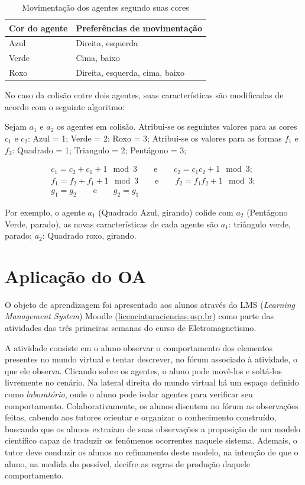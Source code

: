 \documentclass{article}
\begin{document}
\footnotesize

\begin{table}
\begin{center}
	\begin{tabular}{ll}		
		Cor do agente & Preferências de movimentação \\
		\hline \hline
		Azul          & Direita, esquerda \\
		Verde         & Cima, baixo \\
		Roxo          & Direita, esquerda, cima, baixo
	\end{tabular}
	\caption{Movimentação dos agentes segundo suas cores}
	\label{tab:cor-vs-movimentacao}
\end{center}
\end{table}

\normalsize
No caso da colisão entre dois agentes, suas características são modificadas de
acordo com o seguinte algoritmo:

Sejam $a_1$ e $a_2$ os agentes em colisão. Atribui-se os seguintes valores para as cores $c_1$ e $c_2$: Azul = 1; Verde = 2; Roxo = 3;
Atribui-se os valores para as formas $f_1$ e $f_2$: Quadrado = 1; Triangulo = 2; Pentágono = 3;

\begin{gather}
c_1 = c_2 + c_1 + 1 \mod 3 \qquad\text{e}\qquad c_2 = c_1 c_2 + 1 \mod 3;\\
f_1 = f_2 + f_1 + 1 \mod 3 \qquad\text{e}\qquad f_2 = f_1 f_2 + 1 \mod 3;\\
g_1 = g_2 \qquad\text{e}\qquad g_2 = g_1
\end{gather}

Por exemplo, o agente $a_1$ (Quadrado Azul, girando) colide com $a_2$ (Pentágono Verde, parado),
as novas características de cada agente são $a_1$: triângulo verde, parado;
$a_2$: Quadrado roxo, girando. %

\section{Aplicação do OA}

O objeto de aprendizagem foi apresentado aos alunos através do LMS (\emph{Learning
Management System}) Moodle (\url{licenciaturaciencias.usp.br}) como parte das atividades das três primeiras semanas do curso de Eletromagnetismo. 

A atividade consiste em o aluno observar o comportamento dos elementos presentes no mundo virtual e tentar descrever, no fórum associado à atividade, 
o que ele observa. Clicando sobre os agentes, o aluno pode movê-los e soltá-los livremente no cenário. Na lateral direita do mundo virtual há um espaço 
definido como \emph{laboratório}, onde o aluno pode isolar agentes para verificar seu comportamento. Colaborativamente, os alunos discutem no fórum
as observações feitas, cabendo aos tutores orientar e organizar o conhecimento construído, buscando que os alunos extraiam de suas observações 
a proposição de um modelo científico capaz de traduzir os fenômenos ocorrentes naquele sistema. Ademais, o tutor deve conduzir os alunos no 
refinamento deste modelo, na intenção de que o aluno, na medida do possível, decifre as regras de produção daquele comportamento. 
\end{document}

